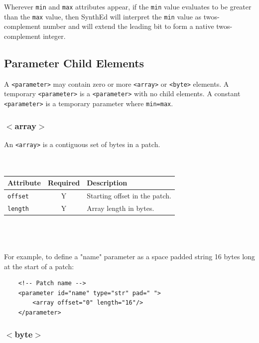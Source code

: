 \documentclass[a4paper,twoside,12pt]{article}
\newcommand{\code}[1]{\color{red}\texttt{#1}\color{black}}
\begin{document}
Wherever \code{min}{} and \code{max}{} attributes appear, if the
\code{min}{} value evaluates to be greater than the \code{max}{}
value, then SynthEd will interpret the \code{min}{} value as
twos-complement number and will extend the leading bit to form a
native twos-complement integer.

\subsection{Parameter Child Elements}

A \code{<parameter>}{} may contain zero or more \code{<array>}{}
or \code{<byte>}{} elements.  A temporary \code{<parameter>}{} is
a \code{<parameter>}{} with no child elements. A constant
\code{<parameter>}{} is a temporary parameter where
\code{min=max}.

\subsubsection{$<$array$>$}

An \code{<array>}{} is a contiguous set of bytes in a patch.
\\
\\
\\
\begin{tabular}{|l|c|p{9cm}|}
\hline
Attribute & Required & Description \\
\hline
\code{offset} & Y & Starting offset in the patch.  \\
\code{length} & Y & Array length in bytes.  \\
\hline
\end{tabular}
\\
\\
\\
For example, to define a "name" parameter as a space padded string
16 bytes long at the start of a patch:
\begin{verbatim}
    <!-- Patch name -->
    <parameter id="name" type="str" pad=" ">
        <array offset="0" length="16"/>
    </parameter>
\end{verbatim}

\subsubsection{$<$byte$>$}
\end{document}
